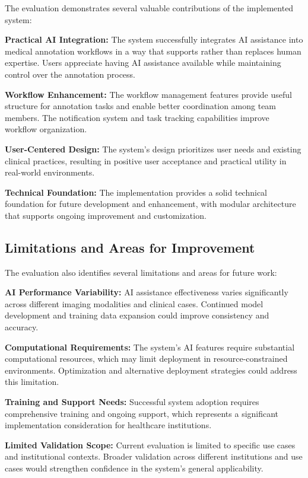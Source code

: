 \begin{table}[htbp]
The evaluation demonstrates several valuable contributions of the implemented system:

\textbf{Practical AI Integration:} The system successfully integrates AI assistance into medical annotation workflows in a way that supports rather than replaces human expertise. Users appreciate having AI assistance available while maintaining control over the annotation process.

\textbf{Workflow Enhancement:} The workflow management features provide useful structure for annotation tasks and enable better coordination among team members. The notification system and task tracking capabilities improve workflow organization.

\textbf{User-Centered Design:} The system's design prioritizes user needs and existing clinical practices, resulting in positive user acceptance and practical utility in real-world environments.

\textbf{Technical Foundation:} The implementation provides a solid technical foundation for future development and enhancement, with modular architecture that supports ongoing improvement and customization.

\subsection{Limitations and Areas for Improvement}

The evaluation also identifies several limitations and areas for future work:

\textbf{AI Performance Variability:} AI assistance effectiveness varies significantly across different imaging modalities and clinical cases. Continued model development and training data expansion could improve consistency and accuracy.

\textbf{Computational Requirements:} The system's AI features require substantial computational resources, which may limit deployment in resource-constrained environments. Optimization and alternative deployment strategies could address this limitation.

\textbf{Training and Support Needs:} Successful system adoption requires comprehensive training and ongoing support, which represents a significant implementation consideration for healthcare institutions.

\textbf{Limited Validation Scope:} Current evaluation is limited to specific use cases and institutional contexts. Broader validation across different institutions and use cases would strengthen confidence in the system's general applicability.


\end{table}

